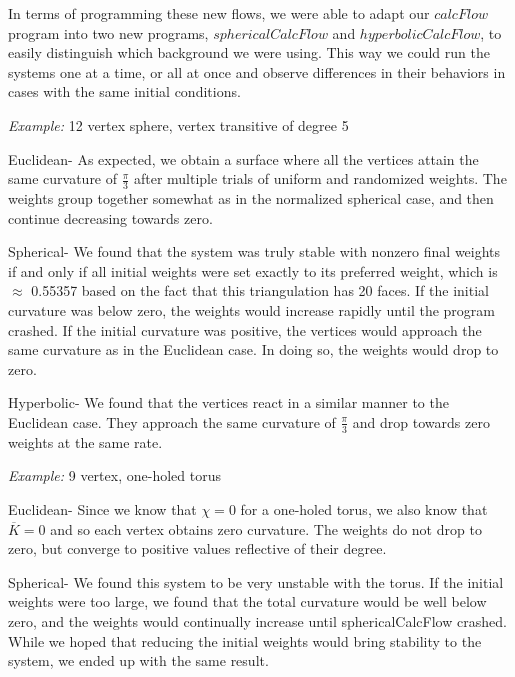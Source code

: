 \documentclass[12pt]{article}
\begin{document}
\noindent In terms of programming these new flows, we were able to adapt our $calcFlow$ program into two new programs, $sphericalCalcFlow$ and $hyperbolicCalcFlow$, to easily distinguish which background we were using. This way we could run the systems one at a time, or all at once and observe differences in their behaviors in cases with the same initial conditions. \newline

\noindent \textit{Example:} 12 vertex sphere, vertex transitive of degree 5\newline

\noindent Euclidean- As expected, we obtain a surface where all the vertices attain the same curvature of $\frac{\pi}{3}$ after multiple trials of uniform and randomized weights. The weights group together somewhat as in the normalized spherical case, and then continue decreasing towards zero.\newline

\noindent Spherical- We found that the system was truly stable with nonzero final weights if and only if all initial weights were set exactly to its preferred weight, which is $\approx$ 0.55357 based on the fact that this triangulation has 20 faces. If the initial curvature was below zero, the weights would increase rapidly until the program crashed. If the initial curvature was positive, the vertices would approach the same curvature as in the Euclidean case. In doing so, the weights would drop to zero.\newline

\noindent Hyperbolic- We found that the vertices react in a similar manner to the Euclidean case. They approach the same curvature of $\frac{\pi}{3}$ and drop towards zero weights at the same rate.\newline 

\noindent \textit{Example:} 9 vertex, one-holed torus\newline

\noindent Euclidean- Since we know that $\chi = 0$ for a one-holed torus, we also know that $\overline{K} = 0$ and so each vertex obtains zero curvature. The weights do not drop to zero, but converge to positive values reflective of their degree. \newline

\noindent Spherical- We found this system to be very unstable with the torus. If the initial weights were too large, we found that the total curvature would be well below zero, and the weights would continually increase until sphericalCalcFlow crashed. While we hoped that reducing the initial weights would bring stability to the system, we ended up with the same result.
\end{document}
